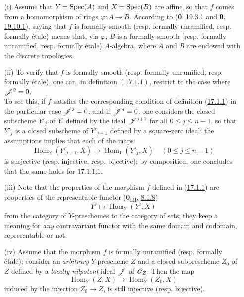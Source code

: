 \begin{remark}[17.1.2]
\label{IV.17.1.2}
\begin{enumerate}
	\item[(i)] Assume that $Y = {\mathop{\mathrm{Spec}}\nolimits}(A)$ and $X = {\mathop{\mathrm{Spec}}\nolimits}(B)$ are affine, so that $f$ comes from a homomorphism of rings $\varphi: A \to B$. According to (\textbf{0}, \hyperref[0.19.3.1]{19.3.1} and \textbf{0}, \hyperref[0.19.10.1]{19.10.1}), saying that $f$ is formally smooth (resp. formally unramified, resp. formally \'etale) means that, via $\varphi$, $B$ is a formally smooth (resp. formally unramified, resp. formally \'etale) $A$-algebra, where $A$ and $B$ are endowed with the discrete topologies.
	\item[(ii)] To verify that $f$ is formally smooth (resp. formally unramified, resp. formally \'etale), one can, in definition $(\hyperref[IV.17.1.1]{17.1.1})$, restrict to the case where $\mathscr{J}^2 = 0$.\\
To see this, if $f$ satisfies the corresponding condition of definition (\hyperref[IV.17.1.1]{17.1.1}) in the particular case $\mathscr{J}^2 = 0$, and if $\mathscr{J}^n = 0$, one considers the closed subscheme $Y'_j$ of $Y'$ defined by the ideal $\mathscr{J}^{j+1}$ for all $0\leq j \leq n-1$, so that $Y'_j$ is a closed subscheme of $Y'_{j+1}$ defined by a square-zero ideal; the assumptions implies that each of the maps
\[
	\operatorname{Hom}_Y(Y'_{j+1}, X) \to \operatorname{Hom}_Y(Y'_j, X) \ \ \ \ \ (0 \leq j \leq n-1) 
\] is surjective (resp. injective, resp. bijective); by composition, one concludes that the same holds for $\hyperref[IV.17.1.1.1]{17.1.1.1}$.
\item[(iii)] Note that the properties of the morphism $f$ defined in (\hyperref[IV.17.1.1]{17.1.1}) are properties of the representable functor (\textbf{0}\textsubscript{III}, \hyperref[0.8.1.8]{8.1.8})
\[
  Y' \mapsto \operatorname{Hom}_Y(Y', X) 
\] from the category of $Y$-preschemes to the category of sets; they keep a meaning for \emph{any} contravariant functor with the same domain and codomain, representable or not.
\item[(iv)] Assume that the morphism $f$ is formally unramified (resp. formally \'etale); consider an \emph{arbitrary} $Y$-prescheme $Z$ and a closed subprescheme $Z_0$ of $Z$ defined by a \emph{locally nilpotent} ideal $\mathscr{J}$ of $\mathscr{O}_Z$. Then the map
\[
\label{IV.17.1.2.1}	
		\operatorname{Hom}_Y(Z, X) \to \operatorname{Hom}_Y(Z_0, X)
\tag{17.1.2.1}
		\] induced by the injection $Z_0 \to Z$, is still injective (resp. bijective).

\end{enumerate}
\end{remark}
